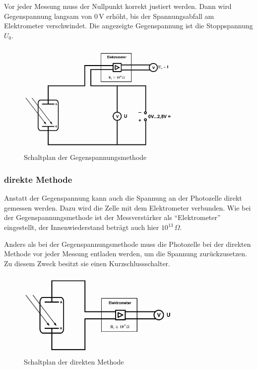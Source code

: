 \documentclass[12pt,a4paper]{scrartcl}
\numberwithin{equation}{section} %
\begin{document}
Vor jeder Messung muss der Nullpunkt korrekt justiert werden. Dann wird Gegenspannung langsam von $0\mathrm{\,V}$ erhöht, bis der Spannungsabfall am Elektrometer verschwindet. Die angezeigte Gegenspannung ist die Stoppspannung $U_0$.

\begin{figure}[h!]
	\centering
	\includegraphics[width=0.7\textwidth]{../media/B1.4/Schaltplan_Gegenspannungsmethode.jpg}
	\caption{Schaltplan der Gegenspannungsmethode}
	\label{fig:Schaltplan Gegenspannungsmethode}
\end{figure}

\subsubsection{direkte Methode}
\label{durchführung:direkt}

Anstatt der Gegenspannung kann auch die Spannung an der Photozelle direkt gemessen werden. Dazu wird die Zelle mit dem Elektrometer verbunden. Wie bei der Gegenspannungsmethode ist der Messverstärker als ``Elektrometer'' eingestellt, der Innenwiederstand beträgt auch hier $10^{13}\,\Omega$.

Anders als bei der Gegenspannungsmethode muss die Photozelle bei der direkten Methode vor jeder Messung entladen werden, um die Spannung zurückzusetzen. Zu diesem Zweck besitzt sie einen Kurzschlussschalter.

\begin{figure}[h!]
	\centering
	\includegraphics[width=0.7\textwidth]{../media/B1.4/Schaltplan_direkte_Methode.jpg}
	\caption{Schaltplan der direkten Methode}
	\label{fig:Schaltplan direkt}
\end{figure}
\end{document}
